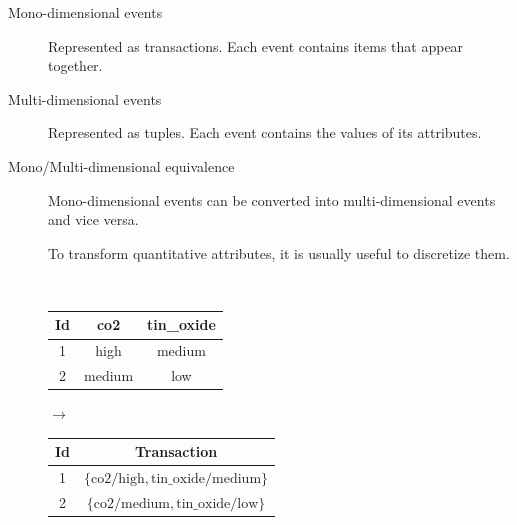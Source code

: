\begin{description}
    \item[Mono-dimensional events] 
        Represented as transactions. Each event contains items that appear together.
        
    \item[Multi-dimensional events] 
        Represented as tuples. Each event contains the values of its attributes.

    \item[Mono/Multi-dimensional equivalence] 
        Mono-dimensional events can be converted into multi-dimensional events and vice versa.

        To transform quantitative attributes, it is usually useful to discretize them.

        \begin{example} \phantom{}\\
            \begin{minipage}{0.35\textwidth}
                \begin{center}
                    \begin{tabular}{c|c|c}
                        \textbf{Id} & \textbf{co2} & \textbf{tin\_oxide} \\
                        \hline
                        1 & high & medium \\
                        2 & medium & low \\
                    \end{tabular}
                \end{center}
            \end{minipage}
            $\rightarrow$
            \begin{minipage}{0.48\textwidth}
                \begin{center}
                    \begin{tabular}{c|c}
                        \textbf{Id} & \textbf{Transaction} \\
                        \hline
                        1 & $\{ \text{co2/high}, \text{tin\_oxide/medium} \}$ \\
                        2 & $\{ \text{co2/medium}, \text{tin\_oxide/low} \}$ \\
                    \end{tabular}
                \end{center}
            \end{minipage}
        \end{example}


\end{description}
